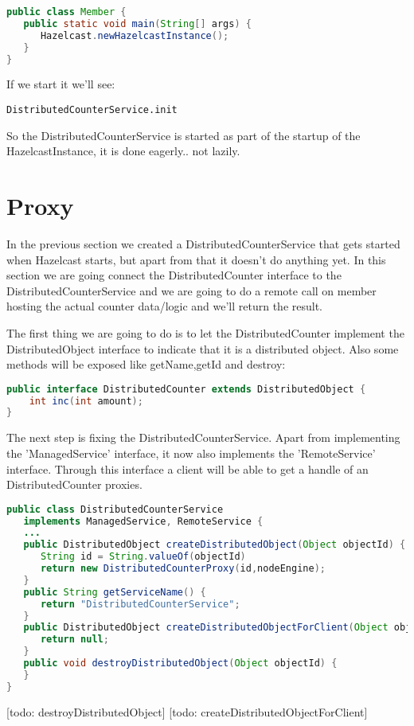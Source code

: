 \begin{lstlisting}[language=java]
public class Member {
   public static void main(String[] args) {
      Hazelcast.newHazelcastInstance();
   }
}
\end{lstlisting}
If we start it we'll see:
\begin{lstlisting}
DistributedCounterService.init
\end{lstlisting}
So the DistributedCounterService is started as part of the startup of the HazelcastInstance, it is done eagerly.. not lazily.

\section{Proxy}
In the previous section we created a DistributedCounterService that gets started when Hazelcast starts, but apart from that it doesn't do anything yet. In this section we are going connect the DistributedCounter interface to the DistributedCounterService and we are going to do a remote call on member hosting the actual counter data/logic and we'll return the result.

The first thing we are going to do is to let the DistributedCounter implement the DistributedObject interface to indicate that it is a distributed object. Also some methods will be exposed like getName,getId and destroy:
\begin{lstlisting}[language=java]
public interface DistributedCounter extends DistributedObject {
    int inc(int amount);
}
\end{lstlisting}

The next step is fixing the DistributedCounterService. Apart from implementing the 'ManagedService' interface, it now also implements the 'RemoteService' interface. Through this interface a client will be able to get a handle of an DistributedCounter proxies. 
\begin{lstlisting}[language=java]
public class DistributedCounterService 
   implements ManagedService, RemoteService {
   ...  
   public DistributedObject createDistributedObject(Object objectId) {
      String id = String.valueOf(objectId)
      return new DistributedCounterProxy(id,nodeEngine);
   }
   public String getServiceName() {
      return "DistributedCounterService";
   }
   public DistributedObject createDistributedObjectForClient(Object objectId) {
      return null;
   }
   public void destroyDistributedObject(Object objectId) {
   }
}
\end{lstlisting}
[todo: destroyDistributedObject]
[todo: createDistributedObjectForClient]

